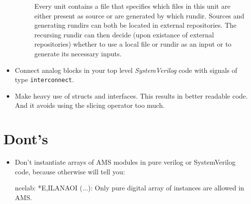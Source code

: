 \begin{itemize}
\begin{description}
		Every unit contains a file that specifies which files in this unit are either present as source or are generated by which rundir.
		Sources and generating rundirs can both be located in external repositories.
		The recursing rundir can then decide (upon existance of external repositories) whether to use a local file or rundir as an input or to generate its necessary inputs.
\end{description}
    \item Connect analog blocks in your top level \textit{SystemVerilog} code
        with signals of type \texttt{interconnect}.
    \item Make heavy use of structs and interfaces. This results in better
        readable code. And it avoids using the slicing operator too much.
\end{itemize}
\section{Dont's}
\begin{itemize}
    \item Don't instantiate arrays of AMS modules in pure verilog or
        SystemVerilog code, because otherwise  will tell you:
        \begin{lstbashplain}
        ncelab: *E,ILANAOI (...):
           Only pure digital array of instances are allowed in AMS.
        \end{lstbashplain}
\end{itemize}

